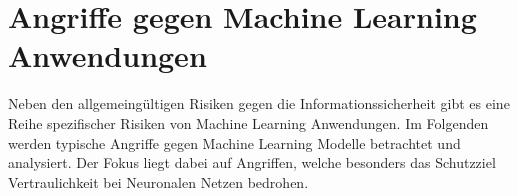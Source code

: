 \chapter{Angriffe gegen Machine Learning Anwendungen}\label{sec:angriffe}

Neben den allgemeingültigen Risiken gegen die Informationssicherheit gibt es eine Reihe spezifischer Risiken von Machine Learning Anwendungen.
Im Folgenden werden typische Angriffe gegen Machine Learning Modelle betrachtet und analysiert. 
Der Fokus liegt dabei auf Angriffen, welche besonders das Schutzziel Vertraulichkeit bei Neuronalen Netzen bedrohen.








%